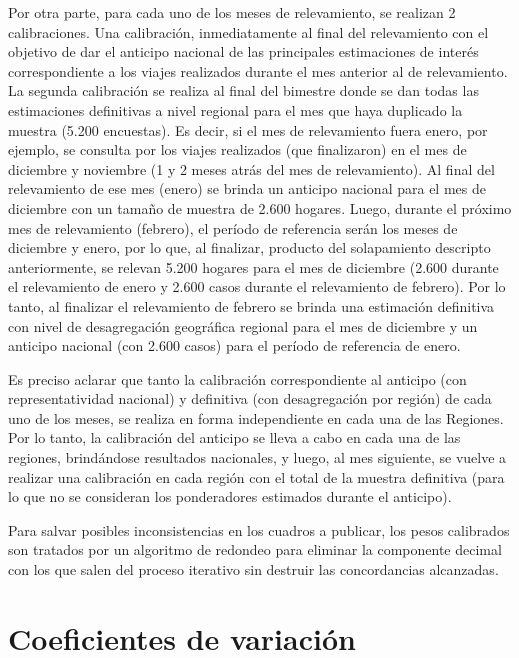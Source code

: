 \documentclass[
  openany]{book}
\begin{document}
Por otra parte, para cada uno de los meses de relevamiento, se realizan 2 calibraciones. Una calibración, inmediatamente al final del relevamiento con el objetivo de dar el anticipo nacional de las principales estimaciones de interés correspondiente a los viajes realizados durante el mes anterior al de relevamiento. La segunda calibración se realiza al final del bimestre donde se dan todas las estimaciones definitivas a nivel regional para el mes que haya duplicado la muestra (5.200 encuestas). Es decir, si el mes de relevamiento fuera enero, por ejemplo, se consulta por los viajes realizados (que finalizaron) en el mes de diciembre y noviembre (1 y 2 meses atrás del mes de relevamiento). Al final del relevamiento de ese mes (enero) se brinda un anticipo nacional para el mes de diciembre con un tamaño de muestra de 2.600 hogares. Luego, durante el próximo mes de relevamiento (febrero), el período de referencia serán los meses de diciembre y enero, por lo que, al finalizar, producto del solapamiento descripto anteriormente, se relevan 5.200 hogares para el mes de diciembre (2.600 durante el relevamiento de enero y 2.600 casos durante el relevamiento de febrero). Por lo tanto, al finalizar el relevamiento de febrero se brinda una estimación definitiva con nivel de desagregación geográfica regional para el mes de diciembre y un anticipo nacional (con 2.600 casos) para el período de referencia de enero.

Es preciso aclarar que tanto la calibración correspondiente al anticipo (con representatividad nacional) y definitiva (con desagregación por región) de cada uno de los meses, se realiza en forma independiente en cada una de las Regiones. Por lo tanto, la calibración del anticipo se lleva a cabo en cada una de las regiones, brindándose resultados nacionales, y luego, al mes siguiente, se vuelve a realizar una calibración en cada región con el total de la muestra definitiva (para lo que no se consideran los ponderadores estimados durante el anticipo).

Para salvar posibles inconsistencias en los cuadros a publicar, los pesos calibrados son tratados por un algoritmo de redondeo para eliminar la componente decimal con los que salen del proceso iterativo sin destruir las concordancias alcanzadas.

\hypertarget{coeficientes-de-variaciuxf3n}{%
\section{Coeficientes de variación}\label{coeficientes-de-variaciuxf3n}}
\end{document}
